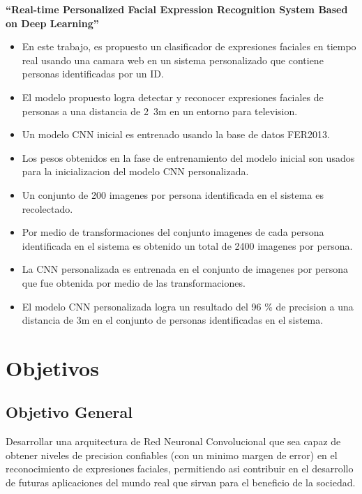 \textbf{“Real-time Personalized Facial Expression
Recognition System
Based on Deep Learning” \cite{lee2016real}}\\

\begin{itemize}
\item En este trabajo, es propuesto un clasificador de expresiones faciales en tiempo real usando una camara web en un sistema personalizado que contiene personas identificadas por un ID.
\item El modelo propuesto logra detectar y reconocer expresiones faciales de personas a una distancia de 2~3m en un entorno para  television.
\item Un modelo CNN inicial es entrenado usando la base de datos FER2013.
\item Los pesos obtenidos en la fase de entrenamiento del modelo inicial son usados para la inicializacion del modelo CNN personalizada.
\item Un conjunto de 200 imagenes por persona identificada en el sistema es recolectado.
\item Por medio de transformaciones del conjunto imagenes de cada persona identificada en el sistema es obtenido un total de 2400 imagenes por persona.
\item La CNN personalizada es entrenada en el conjunto de imagenes por persona que fue obtenida por medio de las transformaciones.
\item El modelo CNN personalizada logra un resultado del 96 \% de precision a una distancia de 3m en el conjunto de personas identificadas en el sistema.

\end{itemize}


\section{Objetivos}
\subsection{Objetivo General}
Desarrollar una arquitectura de Red Neuronal Convolucional que sea capaz de obtener niveles de precision confiables (con un minimo margen de error) en el reconocimiento de expresiones faciales, permitiendo asi contribuir en el desarrollo de futuras aplicaciones del mundo real que sirvan para el beneficio de la sociedad.
